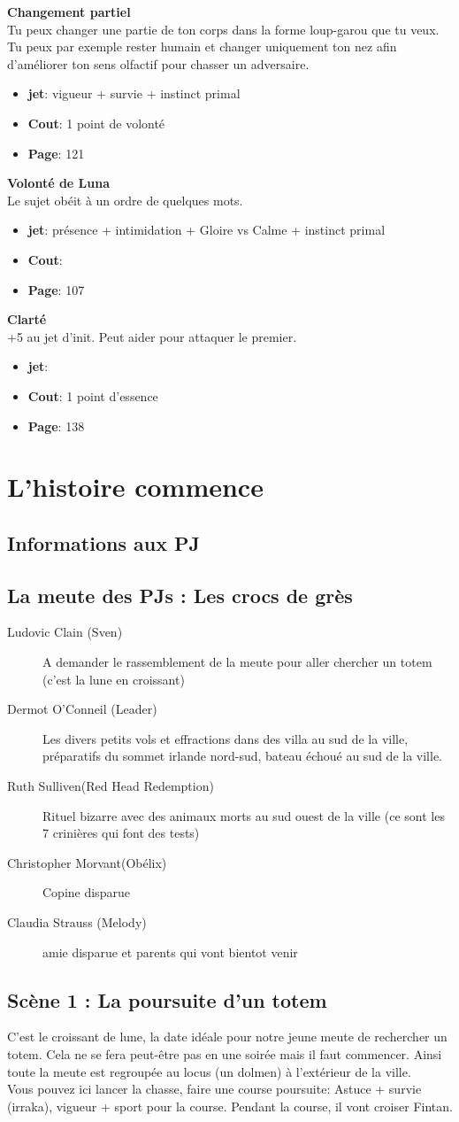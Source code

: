 \documentclass[oneside,12pt]{book}
\newcommand\don[5]{
\textbf{#1} \\
#2
\begin{itemize}
\item{ \textbf{jet}: #3}
\item{ \textbf{Cout}: #4}
\item{ \textbf{Page}: #5}
\end{itemize}
\vspace{0.5cm}
}
\begin{document}
\begin{flushleft}
\don{Changement partiel}{Tu peux changer une partie de ton corps dans la forme loup-garou que tu veux. Tu peux par exemple rester humain et changer uniquement ton nez afin d'améliorer ton sens olfactif pour chasser un adversaire. }{vigueur + survie + instinct primal}{1 point de volonté}{121}
\don{Volonté de Luna}{Le sujet obéit à un ordre de quelques mots. }{présence + intimidation + Gloire vs Calme + instinct primal}{}{107}
\don{Clarté}{+5 au jet d'init. Peut aider pour attaquer le premier.}{}{1 point d'essence}{138}

\chapter{L'histoire commence}
\section{Informations aux PJ}
\section{La meute des PJs : Les crocs de grès }
\begin{description}
\item[Ludovic Clain (Sven)]{ A demander le rassemblement de la meute pour aller chercher un totem (c'est la lune en croissant) }
\item[Dermot O'Conneil (Leader)]{Les divers petits vols et effractions dans des villa au sud de la ville, préparatifs du sommet irlande nord-sud, bateau échoué au sud de la ville. }
\item[Ruth Sulliven(Red Head Redemption)]{ Rituel bizarre avec des animaux morts au sud ouest de la ville (ce sont les 7 crinières qui font des tests) }
\item[Christopher Morvant(Obélix)]{ Copine disparue }
\item[Claudia Strauss (Melody)]{ amie disparue et parents qui vont bientot venir }
\end{description}


\section{Scène 1 : La poursuite d'un totem}
C'est le croissant de lune, la date idéale pour notre jeune meute de rechercher un totem. Cela ne se fera peut-être pas en une soirée mais il faut commencer. 
Ainsi toute la meute est regroupée au locus (un dolmen) à l'extérieur de la ville. \\
Vous pouvez ici lancer la chasse, faire une course poursuite: Astuce + survie (irraka), vigueur + sport pour la course.
Pendant la course, il vont croiser Fintan.


\end{flushleft}
\end{document}
